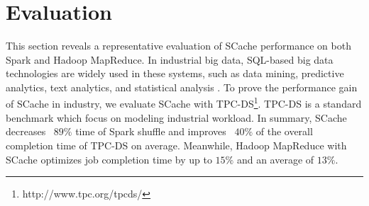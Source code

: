 \section{Evaluation}\label{evaluation}

{\color{blue}
This section reveals a representative evaluation of SCache performance on both Spark and Hadoop MapReduce.
In industrial big data, SQL-based big data technologies are widely used in these systems, such as data mining, predictive analytics, text analytics, and statistical analysis \cite{poess2017analysis}.
To prove the performance gain of SCache in industry, 
we evaluate SCache with TPC-DS\footnote{http://www.tpc.org/tpcds/}.
TPC-DS is a standard benchmark which focus on modeling industrial workload.
In summary, SCache decreases ~$89\%$ time of Spark shuffle and improves ~$40\%$ of the overall completion time of TPC-DS on average.
Meanwhile, Hadoop MapReduce with SCache optimizes job completion time by up to $15\%$ and an average of $13\%$.
}


